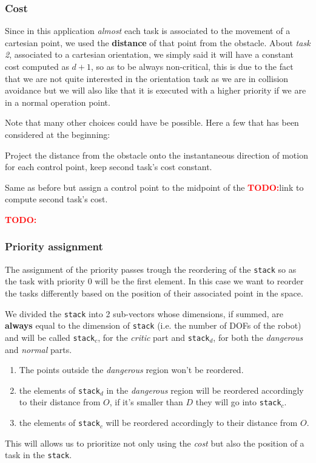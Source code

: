 \documentclass[12pt,a4paper, twocolumn, twoside]{article}
\newcommand{\todo}{\textcolor{red}{\textbf{TODO:}}}
\begin{document}
\subsubsection{Cost}
Since in this application \textit{almost} each task is associated to the movement of a cartesian point, we used the \textbf{distance} of that point from the obstacle.
About \textit{task 2}, associated to a cartesian orientation, we simply said it will have a constant cost computed as $d + 1$, so as to be always non-critical, this is due to the fact that we are not quite interested in the orientation task as we are in collision avoidance but we will also like that it is executed with a higher priority if we are in a normal operation point.

Note that many other choices could have be possible. Here a few that has been considered at the beginning:
\begin{list}{\textbf{Case:}}{}
\item Project the distance from the obstacle onto the instantaneous direction of motion for each control point, keep second task's cost constant.
\item Same as before but assign a control point to the midpoint of the \todo link to compute second task's cost.
\item \todo
\end{list}
\subsubsection{Priority assignment}

The assignment of the priority passes trough the reordering of the \texttt{stack} so as the task with priority $0$ will be the first element.
In this case we want to reorder the tasks differently based on the position of their associated point in the space.

We divided the \texttt{stack} into 2 sub-vectors whose dimensions, if summed, are \textbf{always} equal to the dimension of \texttt{stack} (i.e. the number of DOFs of the robot) and will be called \texttt{stack$_c$}, for the \emph{critic} part and \texttt{stack$_d$}, for both the \emph{dangerous} and \emph{normal} parts.

\begin{enumerate}
\item The points outside the \emph{dangerous} region won't be reordered.
\item the elements of \texttt{stack$_d$} in the \emph{dangerous} region will be reordered accordingly to their distance from $O$, if it's smaller than $D$ they will go into \texttt{stack$_c$}.
\item the elements of \texttt{stack$_c$} will be reordered accordingly to their distance from $O$.
\end{enumerate}
This will allows us to prioritize not only using the \emph{cost} but also the position of a task in the \texttt{stack}.
\end{document}
